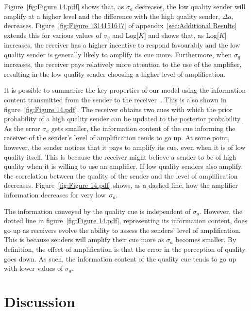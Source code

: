 \documentclass[a4paper,12pt]{article}
\numberwithin{equation}{section}
\numberwithin{figure}{section}
\begin{document}
Figure~\ref{fig:Figure 14.pdf} shows that, as $\sigma_{a}$ decreases, the low quality sender will amplify at a higher level and the difference with the high quality sender, $\Delta a$, decreases. Figure~\ref{fig:Figure 1314151617} of appendix~\ref{sec:Additional Results} extends this for various values of $\sigma_{q}$ and Log[$K$] and shows that, as Log[$K$] increases, the receiver has a higher incentive to respond favourably and the low quality sender is generally likely to amplify its cue more. Furthermore, when $\sigma_{q}$ increases, the receiver pays relatively more attention to the use of the amplifier, resulting in the low quality sender choosing a higher level of amplification.

It is possible to summarise the key properties of our model using the information content transmitted from the sender to the receiver~\cite{Applebaum1996}. This is also shown in figure~\ref{fig:Figure 14.pdf}. The receiver obtains two cues with which the prior probability of a high quality sender can be updated to the posterior probability. As the error $\sigma_{a}$ gets smaller, the information content of the cue informing the receiver of the sender's level of amplification tends to go up. At some point, however, the sender notices that it pays to amplify its cue, even when it is of low quality itself. This is because the receiver might believe a sender to be of high quality when it is willing to use an amplifier. If low quality senders also amplify, the correlation between the quality of the sender and the level of amplification decreases. Figure~\ref{fig:Figure 14.pdf} shows, as a dashed line, how the amplifier information decreases for very low~$\sigma_{a}$.

The information conveyed by the quality cue is independent of $\sigma_{a}$. However, the dotted line in figure~\ref{fig:Figure 14.pdf}, representing its information content, does go up as receivers evolve the ability to assess the senders' level of amplification. This is because senders will amplify their cue more as $\sigma_{a}$ becomes smaller. By definition, the effect of amplification is that the error in the perception of quality goes down. As such, the information content of the quality cue tends to go up with lower values of $\sigma_{a}$.

\newpage


\section{Discussion}
\label{sec:Discussion}
\end{document}
